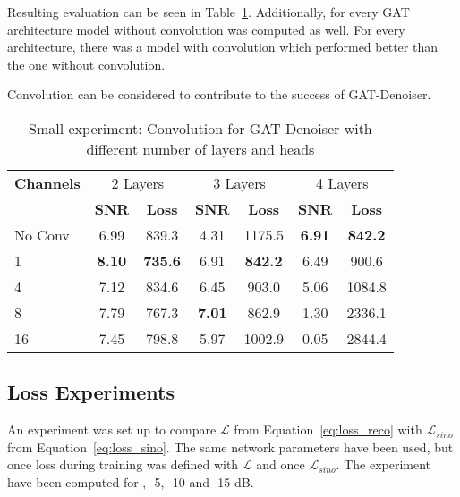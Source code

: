 Resulting evaluation can be seen in Table~\ref{tab:small_convolution_2}.
Additionally, for every GAT architecture model without convolution was computed as well.
For every architecture, there was a model with convolution which performed better than the one without convolution.


\begin{tcolorbox}[colback=red!5!white,colframe=red!75!black]
  Convolution can be considered to contribute to the success of GAT-Denoiser.
\end{tcolorbox}



\begin{table}[H]
  \centering
  \begin{tabular}{l|cc|cc|cc}
    \toprule
    \textbf{Channels } & \multicolumn{2}{c|}{2 Layers} & \multicolumn{2}{c|}{3 Layers} & \multicolumn{2}{c}{4 Layers}  \\
                       & \textbf{SNR} & \textbf{Loss} & \textbf{SNR} & \textbf{Loss} & \textbf{SNR} & \textbf{Loss} \\ 
    \midrule
		No Conv & 6.99  & 839.3 & 4.31   & 1175.5 & \textbf{6.91} & \textbf{842.2}     \\ \hline
		1       & \textbf{8.10}  & \textbf{735.6} & 6.91   & \textbf{842.2} & 6.49 & 900.6     \\ \hline
		4       & 7.12  & 834.6 & 6.45   & 903.0 & 5.06 & 1084.8   \\ \hline
		8       & 7.79  & 767.3 & \textbf{7.01}   & 862.9 & 1.30 & 2336.1    \\ \hline
		16      & 7.45  & 798.8 & 5.97   & 1002.9 & 0.05  & 2844.4   \\
    \midrule
  \end{tabular}

  \caption{Small experiment: Convolution for GAT-Denoiser with different number of layers and heads}
  \label{tab:small_convolution_2}
\end{table}



\subsection{Loss Experiments}
An experiment was set up to compare $\mathcal{L}$ from Equation~\ref{eq:loss_reco} 
with $\mathcal{L}_{sino}$ from Equation~\ref{eq:loss_sino}.
The same network parameters have been used, but once loss during training was defined 
with $\mathcal{L}$ and once $\mathcal{L}_{sino}$. The experiment
have been computed for , -5, -10 and -15 dB.

